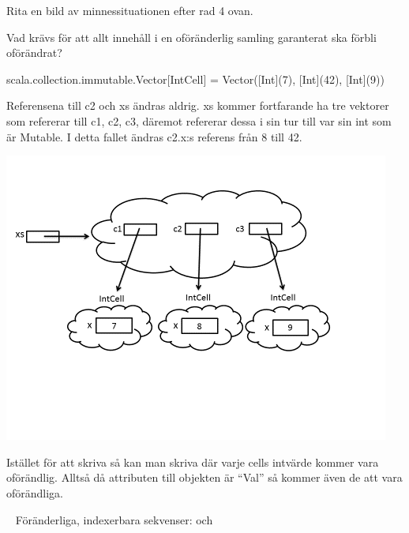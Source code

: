 \Subtask\Pen Rita en bild av minnessituationen efter rad 4 ovan.

\Subtask\Pen Vad krävs för att allt innehåll i en oföränderlig samling garanterat ska förbli oförändrat?

\SOLUTION


\TaskSolved \what


\SubtaskSolved  \begin{REPL}
scala.collection.immutable.Vector[IntCell] =
    Vector([Int](7), [Int](42), [Int](9))
\end{REPL}
Referensena till c2 och xs ändras aldrig.
xs kommer fortfarande ha tre vektorer som refererar till c1, c2, c3, däremot refererar dessa i sin tur till var sin int som är Mutable.
I detta fallet ändras c2.x:s referens från 8 till 42.

\SubtaskSolved  \includegraphics{../img/w05-solutions/memory-pic-1}

\SubtaskSolved  Istället för att skriva  så kan man skriva  där varje cells intvärde kommer vara oförändlig.
Alltså då attributen till objekten är “Val” så kommer även de att vara oförändliga.



\QUESTEND









\QUESTBEGIN

\Task  \what~ Föränderliga, indexerbara sekvenser:  och 

